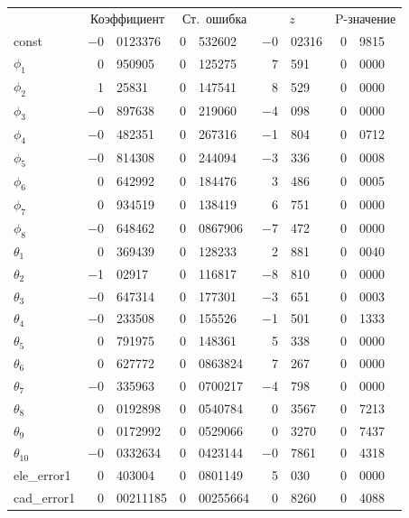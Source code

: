 \documentclass[a4paper,12pt]{article}
\begin{document}
\begin{table}[H]
\begin{center}
	\begin{tabular}{lr@{,}lr@{,}lr@{,}lr@{,}l}
		&
		\multicolumn{2}{c}{Коэффициент} &
		\multicolumn{2}{c}{Ст.\ ошибка} &
		\multicolumn{2}{c}{$z$} &
		\multicolumn{2}{c}{P-значение} \\[1ex]
		const &
		$-$0&0123376 &
		0&532602 &
		$-$0&02316 &
		0&9815 \\
		$\phi_{1}$ &
		0&950905 &
		0&125275 &
		7&591 &
		0&0000 \\
		$\phi_{2}$ &
		1&25831 &
		0&147541 &
		8&529 &
		0&0000 \\
		$\phi_{3}$ &
		$-$0&897638 &
		0&219060 &
		$-$4&098 &
		0&0000 \\
		$\phi_{4}$ &
		$-$0&482351 &
		0&267316 &
		$-$1&804 &
		0&0712 \\
		$\phi_{5}$ &
		$-$0&814308 &
		0&244094 &
		$-$3&336 &
		0&0008 \\
		$\phi_{6}$ &
		0&642992 &
		0&184476 &
		3&486 &
		0&0005 \\
		$\phi_{7}$ &
		0&934519 &
		0&138419 &
		6&751 &
		0&0000 \\
		$\phi_{8}$ &
		$-$0&648462 &
		0&0867906 &
		$-$7&472 &
		0&0000 \\
		$\theta_{1}$ &
		0&369439 &
		0&128233 &
		2&881 &
		0&0040 \\
		$\theta_{2}$ &
		$-$1&02917 &
		0&116817 &
		$-$8&810 &
		0&0000 \\
		$\theta_{3}$ &
		$-$0&647314 &
		0&177301 &
		$-$3&651 &
		0&0003 \\
		$\theta_{4}$ &
		$-$0&233508 &
		0&155526 &
		$-$1&501 &
		0&1333 \\
		$\theta_{5}$ &
		0&791975 &
		0&148361 &
		5&338 &
		0&0000 \\
		$\theta_{6}$ &
		0&627772 &
		0&0863824 &
		7&267 &
		0&0000 \\
		$\theta_{7}$ &
		$-$0&335963 &
		0&0700217 &
		$-$4&798 &
		0&0000 \\
		$\theta_{8}$ &
		0&0192898 &
		0&0540784 &
		0&3567 &
		0&7213 \\
		$\theta_{9}$ &
		0&0172992 &
		0&0529066 &
		0&3270 &
		0&7437 \\
		$\theta_{10}$ &
		$-$0&0332634 &
		0&0423144 &
		$-$0&7861 &
		0&4318 \\
		ele\_error1 &
		0&403004 &
		0&0801149 &
		5&030 &
		0&0000 \\
		cad\_error1 &
		0&00211185 &
		0&00255664 &
		0&8260 &
		0&4088 \\
	\end{tabular}
	

\end{center}
\end{table}
\end{document}
